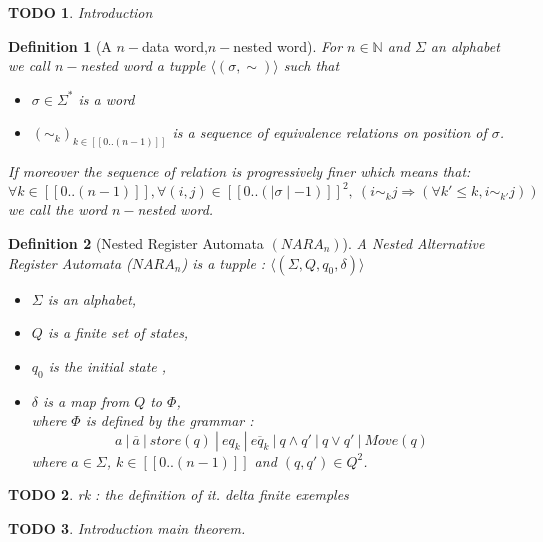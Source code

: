 \documentclass[a4paper,10pt]{report}
\title{}
\author{}
\newtheorem{df}{Definition}
\newtheorem{td}{TODO}
\newcommand{\seg}[1]{[\![#1]\!]}
\newcommand{\segw}[1]{\seg{0..(\mid #1\mid -1)}}
\newcommand{\ts}{\seg{0 .. (n-1)}}
\begin{document}
\maketitle

\begin{td}
  Introduction
\end{td}

\begin{df}[A $n-$data word,$n-$nested word]
 For $n \in \mathbb{N}$ and $\Sigma$ an alphabet we call $n-$nested word a tupple  
 $\langle (\sigma , \sim )  \rangle$
 such that 
  \begin{itemize}
   \item $\sigma \in \Sigma^* $ is a word
   \item $(\sim_k)_{k \in \ts }$ is a sequence of equivalence relations on position of $\sigma$. 
  \end{itemize}
  If moreover the sequence of relation is progressively finer which means that:  
  $$\forall k \in \ts, \forall (i,j) \in \segw{\sigma}^2, \ (i \sim_k j \Rightarrow \left ( \forall k' \leq k, i \sim_{k'} j \right )) $$ 
   we call the word $n-$nested word.
\end{df}



\begin{df}[Nested Register Automata $(NARA_n)$]
  A Nested Alternative Register Automata ($NARA_n$) is a tupple : 
  $\langle (\Sigma ,Q ,q_0, \delta )  \rangle$
  \begin{itemize}
   \item $\Sigma$ is an alphabet,
   \item $Q$ is a finite set of states,
   \item $q_0$ is the initial state ,
   \item $ \delta $ is a map from $Q $ to $\Phi $, \\ 
   where $\Phi$ is defined by the grammar : 
   $$ a \ | \  \overline{a} \ | \ store(q) \ | \ eq_k \ | \  \overline{eq_k} \ | \  q \wedge q' \ | \ q \vee q' \ | \ Move(q)  $$
  where $a \in \Sigma$, $k \in  \ts$ and $(q,q') \in Q^2$.
  \end{itemize}

\end{df}
\begin{td}
  rk : the definition of it.
  delta finite
  exemples
\end{td}

\begin{td}
  Introduction main theorem.
\end{td}
\end{document}
